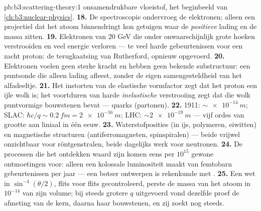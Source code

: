\begin{solution}{pb:b3:scattering-theory:1}
onsamendrukbare vloeistof, het beginbeeld van
\cref{ch:b3:nuclear-physics}.
\textbf{18.} De spectroscopie ondervroeg de elektronen; alleen een
projectiel dat het atoom binnendringt kon getuigen waar de
\emph{positieve} lading en de massa zitten.
\textbf{19.} Elektronen van $20$ GeV die onder onwaarschijnlijk grote
hoeken verstrooiden en veel energie verloren --- te veel harde
gebeurtenissen voor een zacht proton: de terugkaatsing van Rutherford,
opnieuw opgevoerd.
\textbf{20.} Elektronen voelen geen sterke kracht en hebben geen bekende
substructuur: een puntsonde die alleen lading afleest, zonder de eigen
samengesteldheid van het alfadeeltje.
\textbf{21.} Het instorten van de elastische vormfactor zegt dat het
proton een ijle wolk is; het voortduren van harde \emph{inelastische}
verstrooiing zegt dat die wolk puntvormige bouwstenen bevat --- quarks
(partonen).
\textbf{22.} 1911: $\sim\qty{e-14}{m}$; SLAC: $\hbar c/q \sim
\qty{0.2}{fm} = \qty{2e-16}{m}$; LHC: $\sim\qty{2e-19}{m}$ --- vijf ordes
van grootte aan liniaal in één eeuw.
\textbf{23.} Waterstofposities (in ijs, polymeren, eiwitten) en
magnetische structuren (antiferromagneten, spinspiralen) --- beide vrijwel
onzichtbaar voor röntgenstralen, beide dagelijks werk voor neutronen.
\textbf{24.} De processen die het ontdekken waard zijn komen eens per
$10^{15}$ gewone ontmoetingen voor: alleen een kolossale luminositeit maakt
van femtobarn gebeurtenissen per jaar --- een botser ontwerpen is
rekenkunde met .
\textbf{25.} Een wet in $\sin^{-4}(\theta/2)$, flits voor flits
gecontroleerd, perste de massa van het atoom in $10^{-14}$ van zijn
volume; bij steeds grotere $q$ uitgevoerd vond dezelfde proef de afmeting
van de kern, daarna haar bouwstenen, en zij zoekt nog steeds.
\end{solution}
